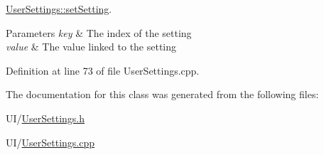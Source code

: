 \hyperlink{class_user_settings_aef31a9f5222e267a9577660105e6b256}{User\+Settings\+::set\+Setting}. 


\begin{DoxyParams}{Parameters}
{\em key} & The index of the setting \\
\hline
{\em value} & The value linked to the setting \\
\hline
\end{DoxyParams}


Definition at line 73 of file User\+Settings.\+cpp.



The documentation for this class was generated from the following files\+:\begin{DoxyCompactItemize}
\item 
U\+I/\hyperlink{_user_settings_8h}{User\+Settings.\+h}\item 
U\+I/\hyperlink{_user_settings_8cpp}{User\+Settings.\+cpp}\end{DoxyCompactItemize}
